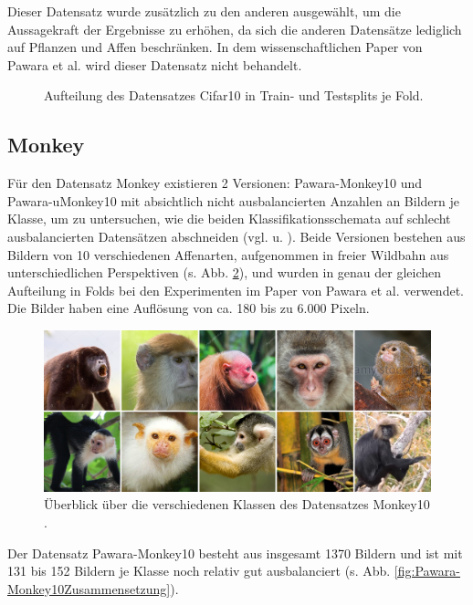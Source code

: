 Dieser Datensatz wurde zusätzlich zu den anderen ausgewählt, um die Aussagekraft der Ergebnisse zu erhöhen, da sich die anderen Datensätze lediglich auf Pflanzen und Affen beschränken. In dem wissenschaftlichen Paper von Pawara et al. \cite{pawaraPaper} wird dieser Datensatz nicht behandelt.

\begin{figure}[H]
\begin{adjustbox}{width=1.4\textwidth, center}

\end{adjustbox}
\caption{Aufteilung des Datensatzes Cifar10 \cite{cifar10} in Train- und Testsplits je Fold.}
\label{fig:Cifar10Zusammensetzung}
\end{figure}


\subsection{Monkey}
Für den Datensatz Monkey existieren 2 Versionen: Pawara-Monkey10 und Pawara-uMonkey10 mit absichtlich nicht ausbalancierten Anzahlen an Bildern je Klasse, um zu untersuchen, wie die beiden Klassifikationsschemata auf schlecht ausbalancierten Datensätzen abschneiden (vgl. \cite{pawaraWebsiteDatensaetze} u. \cite{pawaraPaper}). Beide Versionen bestehen aus Bildern von 10 verschiedenen Affenarten, aufgenommen in freier Wildbahn aus unterschiedlichen Perspektiven (s. Abb. \ref{fig:monkeyUeberblick}), und wurden in genau der gleichen Aufteilung in Folds bei den Experimenten im Paper von Pawara et al. \cite{pawaraPaper} verwendet.
Die Bilder haben eine Auflösung von ca. 180 bis zu 6.000 Pixeln.
\begin{figure}[H]
\centering
\includegraphics[scale=0.08]{img/2_monkey10-image.jpg}
\caption{Überblick über die verschiedenen Klassen des Datensatzes Monkey10 \cite{pawaraMonkey}.}
\label{fig:monkeyUeberblick}
\end{figure}

Der Datensatz Pawara-Monkey10 besteht aus insgesamt 1370 Bildern und ist mit 131 bis 152 Bildern je Klasse noch relativ gut ausbalanciert (s. Abb. \ref{fig:Pawara-Monkey10Zusammensetzung}).\\

